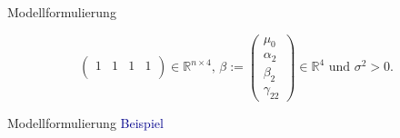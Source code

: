 \documentclass[
  8pt,
  ignorenonframetext,
]{beamer}
\begin{document}
\begin{frame}{Modellformulierung}
\begin{theorem}
\begin{equation}
\begin{pmatrix}
1       &   1       &   1        &  1       \\
\end{pmatrix} \in \mathbb{R}^{n \times 4}, \,
\beta :=
\begin{pmatrix}
\mu_0               \\
\alpha_{2}          \\
\beta_{2}           \\
\gamma_{22}
\end{pmatrix}
\in \mathbb{R}^{4}
\mbox{ und }
\sigma^2 > 0.
\end{equation}
\end{theorem}
\end{frame}

\begin{frame}{Modellformulierung}
\protect\hypertarget{modellformulierung-10}{}
\textcolor{darkblue}{Beispiel}

\footnotesize


\end{frame}
\end{document}
